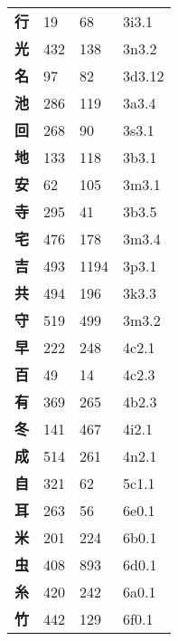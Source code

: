 \begin{longtable}[c]{llll}
    \bfseries 行 & 19 & 68 & 3i3.1\\
    \bfseries 光 & 432 & 138 & 3n3.2\\
    \bfseries 名 & 97 & 82 & 3d3.12\\
    \bfseries 池 & 286 & 119 & 3a3.4\\
    \bfseries 回 & 268 & 90 & 3s3.1\\
    \bfseries 地 & 133 & 118 & 3b3.1\\
    \bfseries 安 & 62 & 105 & 3m3.1\\
    \bfseries 寺 & 295 & 41 & 3b3.5\\
    \bfseries 宅 & 476 & 178 & 3m3.4\\
    \bfseries 吉 & 493 & 1194 & 3p3.1\\
    \bfseries 共 & 494 & 196 & 3k3.3\\
    \bfseries 守 & 519 & 499 & 3m3.2\\
    \bfseries 早 & 222 & 248 & 4c2.1\\
    \bfseries 百 & 49 & 14 & 4c2.3\\
    \bfseries 有 & 369 & 265 & 4b2.3\\
    \bfseries 冬 & 141 & 467 & 4i2.1\\
    \bfseries 成 & 514 & 261 & 4n2.1\\
    \bfseries 自 & 321 & 62 & 5c1.1\\
    \bfseries 耳 & 263 & 56 & 6e0.1\\
    \bfseries 米 & 201 & 224 & 6b0.1\\
    \bfseries 虫 & 408 & 893 & 6d0.1\\
    \bfseries 糸 & 420 & 242 & 6a0.1\\
    \bfseries 竹 & 442 & 129 & 6f0.1\\
  \end{longtable}
